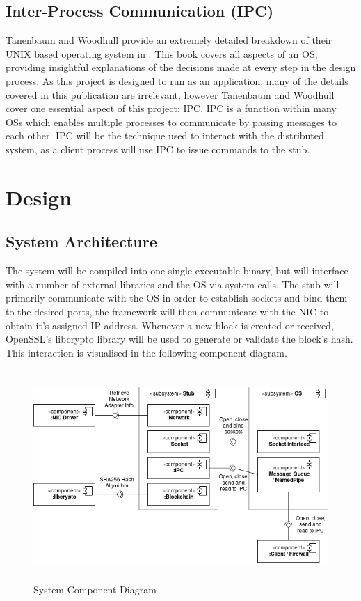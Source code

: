 \documentclass[a4paper, 11pt]{report}
\begin{document}
\section{Inter-Process Communication (IPC)}
Tanenbaum and Woodhull provide an extremely detailed breakdown of their UNIX based operating system in  \cite{operatingsystems}. This book covers all aspects of an \acrshort{OS}, providing insightful explanations of the decisions made at every step in the design process. As this project is designed to run as an application, many of the details covered in this publication are irrelevant, however Tanenbaum and Woodhull cover one essential aspect of this project: \acrfull{IPC}. \acrshort{IPC} is a function within many \acrlong{OS}s which enables multiple processes to communicate by passing messages to each other. \acrshort{IPC} will be the technique used to interact with the distributed system, as a client process will use \acrshort{IPC} to issue commands to the \gls{stub}. 

\chapter{Design}

\section{System Architecture}
The system will be compiled into one single executable binary, but will interface with a number of external libraries and the \acrshort{OS} via system calls. The stub will primarily communicate with the \acrshort{OS} in order to establish sockets and bind them to the desired ports, the framework will then communicate with the \acrfull{NIC} to obtain it's assigned \acrfull{IP} address. Whenever a new block is created or received, OpenSSL's libcrypto library \cite{libcrypto} will be used to generate or validate the block's hash. This interaction is visualised in the following component diagram.

\begin{figure}[H]
\centering
\includegraphics[height=8cm,keepaspectratio]{componentdiagram}
\caption{System Component Diagram} 
\label{fig:comp}
\end{figure}
\end{document}
